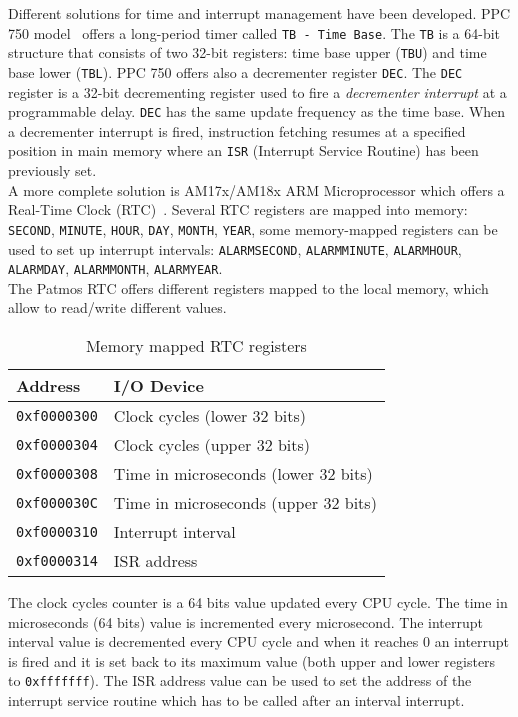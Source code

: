 Different solutions for time and interrupt management have been developed. PPC 750 model~\cite{PPC750:2012} offers a long-period timer called \texttt{TB - Time Base}. The \texttt{TB} is a 64-bit structure that consists of two 32-bit registers: time base upper (\texttt{TBU}) and time base lower (\texttt{TBL}). PPC 750 offers also a decrementer register \texttt{DEC}. The \texttt{DEC} register is a 32-bit decrementing register used to fire a \textit{decrementer interrupt} at a programmable delay. \texttt{DEC} has the same update frequency as the time base. When a decrementer interrupt is fired, instruction fetching resumes at a specified position in main memory where an \texttt{ISR} (Interrupt Service Routine) has been previously set.\\ 
A more complete solution is AM17x/AM18x ARM Microprocessor which offers a Real-Time Clock (RTC)~\cite{AM17x/AM18x:2011}. Several RTC registers are mapped into memory: \texttt{SECOND}, \texttt{MINUTE}, \texttt{HOUR}, \texttt{DAY}, \texttt{MONTH}, \texttt{YEAR}, some memory-mapped registers can be used to set up interrupt intervals: \texttt{ALARMSECOND}, \texttt{ALARMMINUTE}, \texttt{ALARMHOUR}, \texttt{ALARMDAY}, \texttt{ALARMMONTH}, \texttt{ALARMYEAR}.\\

The Patmos RTC offers different registers mapped to the local memory, which allow to read/write different values.

\begin{table}[!h]
\centering
\begin{tabular}{l|l}
\textbf{Address} & \textbf{I/O Device}\\
\toprule
\texttt{0xf0000300} & Clock cycles (lower 32 bits)\\
\texttt{0xf0000304} & Clock cycles (upper 32 bits)\\
\texttt{0xf0000308} & Time in microseconds (lower 32 bits)\\
\texttt{0xf000030C} & Time in microseconds (upper 32 bits)\\
\texttt{0xf0000310} & Interrupt interval\\
\texttt{0xf0000314} & ISR address\\
\bottomrule
\end{tabular}
\caption{Memory mapped RTC registers\label{tab:rtc}}
\end{table}

The clock cycles counter is a 64 bits value updated every CPU cycle. The time in microseconds (64 bits) value is incremented every microsecond. The interrupt interval value is decremented every CPU cycle and when it reaches 0 an interrupt is fired and it is set back to
its maximum value (both upper and lower registers to \texttt{0xfffffff}). The ISR address value can be used to set the address of the interrupt service routine which has to be called after an interval interrupt.

